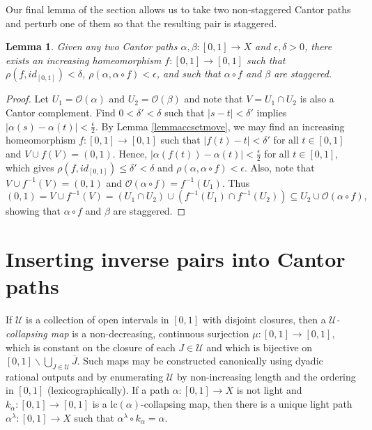 \documentclass[12pt, leqno]{amsart}
\newcommand{\light}{\lambda}
\newcommand{\ui}{[0,1]}
\newcommand{\mco}{\mathcal{O}}
\newcommand{\scru}{\mathscr{U}}
\newcommand{\ov}{\overline}
\newcommand{\lc}{\text{lc}}
\newtheorem{lemma}[theorem]{Lemma}
\theoremstyle{definition}\newtheorem{definition}[theorem]{Definition}
\begin{document}
Our final lemma of the section allows us to take two non-staggered Cantor paths and perturb one of them so that the resulting pair is staggered.

\begin{lemma}\label{staggeredlemma}
Given any two Cantor paths $\alpha,\beta:\ui\to X$ and $\epsilon,\delta>0$, there exists an increasing homeomorphism $f:\ui\to \ui$ such that $\rho(f,id_{\ui})<\delta$, $\rho(\alpha,\alpha\circ f)<\epsilon$, and such that $\alpha\circ f$ and $\beta$ are staggered.
\end{lemma}

\begin{proof}
Let $U_1=\mco(\alpha)$ and $U_2=\mco(\beta)$ and note that $V=U_1\cap U_2$ is also a Cantor complement. Find $0<\delta '<\delta$ such that $|s-t|<\delta'$ implies $|\alpha(s)-\alpha(t)|<\frac{\epsilon}{2}$. By Lemma \ref{lemmaccsetmove}, we may find an increasing homeomorphism $f:\ui\to \ui$ such that $|f(t)-t|<\delta'$ for all $t\in\ui$ and $V\cup f(V)=(0,1)$. Hence, $|\alpha(f(t))-\alpha(t)|<\frac{\epsilon}{2}$ for all $t\in\ui$, which gives $\rho(f,id_{\ui})\leq \delta' <\delta$ and $\rho(\alpha,\alpha\circ f)<\epsilon$. Also, note that $V\cup f^{-1}(V)=(0,1)$ and $\mco(\alpha\circ f)=f^{-1}(U_1)$. Thus
\[(0,1)=V\cup f^{-1}(V)=(U_1\cap U_2)\cup (f^{-1}(U_1)\cap f^{-1}(U_2))\subseteq U_2\cup\mco(\alpha\circ f),\]showing that $\alpha\circ f$ and $\beta$ are staggered.
\end{proof}




\section{Inserting inverse pairs into Cantor paths}\label{sec: inserting inverse pairs}

If $\scru$ is a collection of open intervals in $\ui$ with disjoint closures, then a \textit{$\scru$-collapsing map} is a non-decreasing, continuous surjection $\mu:\ui\to\ui$, which is constant on the closure of each $J\in\scru$ and which is bijective on  $\ui\backslash \bigcup_{J\in\scru}\ov{J}$. Such maps may be constructed canonically using dyadic rational outputs and by enumerating $\scru$ by non-increasing length and the ordering in $\ui$ (lexicographically). If a path $\alpha:\ui\to X$ is not light and $k_{\alpha}:\ui\to\ui$ is a $\lc(\alpha)$-collapsing map, then there is a unique light path $\alpha
^{\light}:\ui\to X$ such that $\alpha^{\light}\circ k_{\alpha}=\alpha$.
\end{document}

